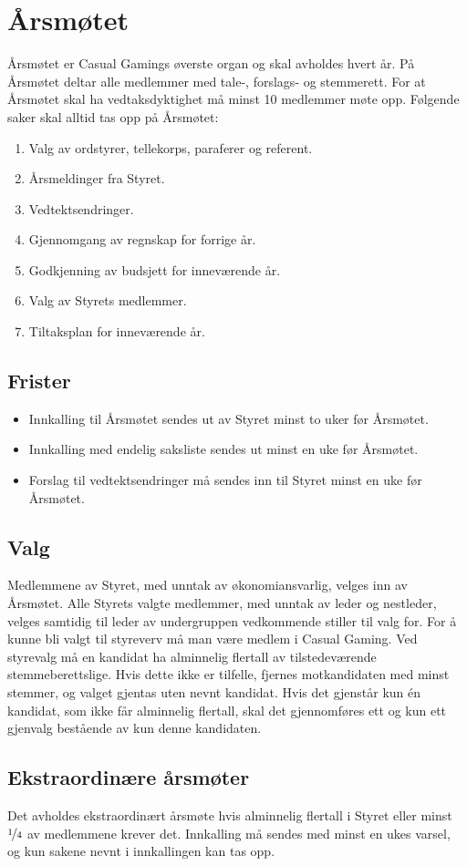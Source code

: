 \chapter{Årsmøtet}
Årsmøtet er Casual Gamings øverste organ og skal avholdes hvert år. På Årsmøtet deltar alle medlemmer med tale-, forslags‐ og stemmerett. For at Årsmøtet skal ha vedtaksdyktighet må minst 10 medlemmer møte opp. Følgende saker skal alltid tas opp på Årsmøtet:
\begin{enumerate}
    \item Valg av ordstyrer, tellekorps, paraferer og referent.
    \item Årsmeldinger fra Styret.
    \item Vedtektsendringer.
    \item Gjennomgang av regnskap for forrige år.
    \item Godkjenning av budsjett for inneværende år.
    \item Valg av Styrets medlemmer.
    \item Tiltaksplan for inneværende år.
\end{enumerate}

\section{Frister}
\begin{itemize}
    \item Innkalling til Årsmøtet sendes ut av Styret minst to uker før Årsmøtet.
    \item Innkalling med endelig saksliste sendes ut minst en uke før Årsmøtet.
    \item Forslag til vedtektsendringer må sendes inn til Styret minst en uke før Årsmøtet.
\end{itemize}

\section{Valg}
Medlemmene av Styret, med unntak av økonomiansvarlig, velges inn av Årsmøtet. Alle Styrets valgte medlemmer, med unntak av leder og nestleder, velges samtidig til leder av undergruppen vedkommende stiller til valg for. For å kunne bli valgt til styreverv må man være medlem i Casual Gaming. Ved styrevalg må en kandidat ha alminnelig flertall av tilstedeværende stemmeberettslige. Hvis dette ikke er tilfelle, fjernes motkandidaten med minst stemmer, og valget gjentas uten nevnt kandidat. Hvis det gjenstår kun én kandidat, som ikke får alminnelig flertall, skal det gjennomføres ett og kun ett gjenvalg bestående av kun denne kandidaten.

\section{Ekstraordinære årsmøter}
Det avholdes ekstraordinært årsmøte hvis alminnelig flertall i Styret eller minst $\nicefrac{1}{4}$ av medlemmene krever det. Innkalling må sendes med minst en ukes varsel, og kun sakene nevnt i innkallingen kan tas opp.
